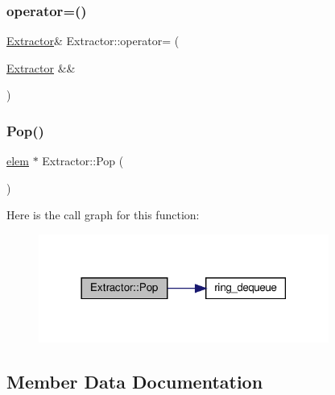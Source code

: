 \mbox{\label{classExtractor_a4fae2fb922e5c5886c4a120aca43d877}} 
\subsubsection{\texorpdfstring{operator=()}{operator=()}\hspace{0.1cm}{\footnotesize\ttfamily [2/2]}}
{\footnotesize\ttfamily \hyperlink{classExtractor}{Extractor}\& Extractor\+::operator= (\begin{DoxyParamCaption}\item[{\hyperlink{classExtractor}{Extractor} \&\&}]{ }\end{DoxyParamCaption})\hspace{0.3cm}{\ttfamily [delete]}}

\mbox{\label{classExtractor_a7632ce0dc24df1eeb659bb124e6b3031}} 
\subsubsection{\texorpdfstring{Pop()}{Pop()}}
{\footnotesize\ttfamily \hyperlink{structelem}{elem} $\ast$ Extractor\+::\+Pop (\begin{DoxyParamCaption}{ }\end{DoxyParamCaption})}

Here is the call graph for this function\+:\nopagebreak
\begin{figure}[H]
\begin{center}
\leavevmode
\includegraphics[width=270pt]{classExtractor_a7632ce0dc24df1eeb659bb124e6b3031_cgraph}
\end{center}
\end{figure}


\subsection{Member Data Documentation}
\mbox{\label{classExtractor_a0e1370bcf808c900d1d3199350ebef41}} 
